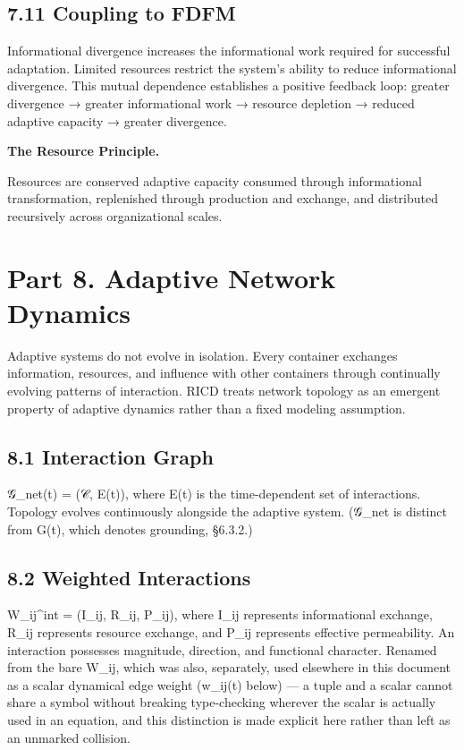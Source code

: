 \documentclass[
]{article}
\begin{document}
\hypertarget{coupling-to-fdfm}{%
\subsection{7.11 Coupling to FDFM}\label{coupling-to-fdfm}}

Informational divergence increases the informational work required for
successful adaptation. Limited resources restrict the system's ability
to reduce informational divergence. This mutual dependence establishes a
positive feedback loop: greater divergence → greater informational work
→ resource depletion → reduced adaptive capacity → greater divergence.

\textbf{The Resource Principle.}

Resources are conserved adaptive capacity consumed through informational
transformation, replenished through production and exchange, and
distributed recursively across organizational scales.

\hypertarget{part-8.-adaptive-network-dynamics}{%
\section{Part 8. Adaptive Network
Dynamics}\label{part-8.-adaptive-network-dynamics}}

Adaptive systems do not evolve in isolation. Every container exchanges
information, resources, and influence with other containers through
continually evolving patterns of interaction. RICD treats network
topology as an emergent property of adaptive dynamics rather than a
fixed modeling assumption.

\hypertarget{interaction-graph}{%
\subsection{8.1 Interaction Graph}\label{interaction-graph}}

𝒢\_net(t) = (𝒞, E(t)), where E(t) is the time-dependent set of
interactions. Topology evolves continuously alongside the adaptive
system. (𝒢\_net is distinct from G(t), which denotes grounding, §6.3.2.)

\hypertarget{weighted-interactions}{%
\subsection{8.2 Weighted Interactions}\label{weighted-interactions}}

W\_ij\^{}int = (I\_ij, R\_ij, P\_ij), where I\_ij represents
informational exchange, R\_ij represents resource exchange, and P\_ij
represents effective permeability. An interaction possesses magnitude,
direction, and functional character. Renamed from the bare W\_ij, which
was also, separately, used elsewhere in this document as a scalar
dynamical edge weight (w\_ij(t) below) --- a tuple and a scalar cannot
share a symbol without breaking type-checking wherever the scalar is
actually used in an equation, and this distinction is made explicit here
rather than left as an unmarked collision.
\end{document}
